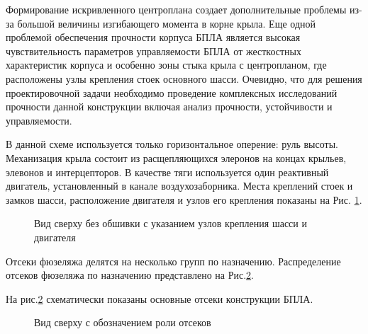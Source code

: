 Формирование искривленного центроплана создает дополнительные проблемы из-за большой величины изгибающего момента в корне крыла. Еще одной проблемой обеспечения прочности корпуса БПЛА является высокая чувствительность параметров управляемости БПЛА от жесткостных характеристик корпуса и особенно зоны стыка крыла с центропланом, где расположены узлы крепления стоек основного шасси. Очевидно, что для решения проектировочной задачи необходимо проведение комплексных исследований прочности данной конструкции включая анализ прочности, устойчивости и управляемости. 

В данной схеме используется только горизонтальное оперение: руль высоты. Механизация крыла состоит из расщепляющихся элеронов на концах крыльев, элевонов и интерцепторов. В качестве тяги используется один реактивный двигатель, установленный в канале воздухозаборника. Места креплений стоек и замков шасси, расположение двигателя и узлов его крепления показаны на Рис. \ref{fig:BPS_Catia_Top_WithoutSkin}. 


\begin{figure}[H]
\centering
\def\svgwidth{0.9\textwidth}

\caption{Вид сверху без обшивки с указанием узлов крепления шасси и двигателя}
\label{fig:BPS_Catia_Top_WithoutSkin}
\end{figure}

Отсеки фюзеляжа делятся на несколько групп по назначению. Распределение отсеков фюзеляжа по назначению представлено на Рис.\ref{fig:BPS_Catia_Top_PartRoles}. 

На рис.\ref{fig:BPS_Catia_Top_PartRoles} схематически показаны основные отсеки конструкции БПЛА. 

\begin{figure}[H]
\centering
\def\svgwidth{0.9\textwidth}

\caption{Вид сверху с обозначением роли отсеков}
\label{fig:BPS_Catia_Top_PartRoles}
\end{figure}











